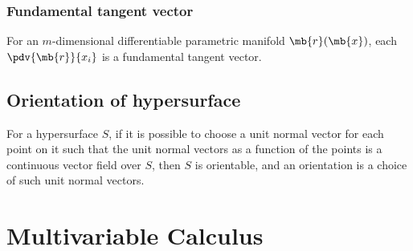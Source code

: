 \documentclass[a4paper,12pt]{report}
\begin{document}
\begin{itemize}
\begin{itemize}
\subsubsection{Fundamental tangent vector}
For an $m$-dimensional differentiable parametric manifold $\mb{r}(\mb{x})$, each $\pdv{\mb{r}}{x_i}$ is a fundamental tangent vector.
\subsection{Orientation of hypersurface}
For a hypersurface $S$, if it is possible to choose a unit normal vector for each point on it such that the unit normal vectors as a function of the points is a continuous vector field over $S$, then $S$ is orientable, and an orientation is a choice of such unit normal vectors.



\section{Multivariable Calculus}

\end{itemize}
\end{itemize}
\end{document}
